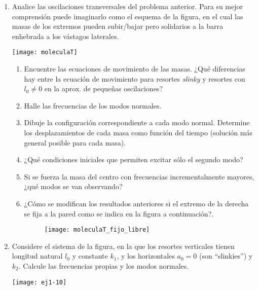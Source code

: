 \documentclass[11pt,spanish,a4paper]{article}
\begin{document}
\begin{enumerate}
\item
\begin{minipage}[t][2.2cm]{0.5\textwidth}
Analice las oscilaciones transversales del problema anterior.
Para su mejor comprensión puede imaginarlo como el esquema de la figura, en el cual las masas de los extremos pueden subir/bajar pero solidarios a la barra enhebrada a los vástagos laterales. 
\end{minipage}
\begin{minipage}[c][0cm][t]{0.45\textwidth}
  \texttt{[image: moleculaT]}
\end{minipage}
\begin{enumerate}
	\item Encuentre las ecuaciones de movimiento de las masas. ¿Qué diferencias hay entre la ecuación de movimiento para resortes \emph{slinky} y resortes con $l_0\ne 0$ en la aprox. de pequeñas oscilaciones?
	\item Halle las frecuencias de los modos normales.
	\item Dibuje la configuración correspondiente a cada modo normal.
Determine los desplazamientos de cada masa como función del tiempo (solución más general posible para cada masa).
	\item ¿Qué condiciones iniciales que permiten excitar sólo el segundo modo?
	\item Si se fuerza la masa del centro con frecuencias incrementalmente mayores, ¿qué modos se van observando?
	\item ¿Cómo se modifican los resultados anteriores si el extremo de la derecha se fija a la pared como se indica en la figura a continuación?.
	\begin{figure}[h]
		\centering
		\texttt{[image: moleculaT\_fijo\_libre]}
	\end{figure} 
\end{enumerate}



\item
\begin{minipage}[t][1.2cm]{0.6\textwidth}
Considere el sistema de la figura, en la que los resortes verticales tienen longitud natural $l_0$ y constante $k_1$, y los horizontales $a_0= 0$ (son ``slinkies'') y $k_2$.
Calcule las frecuencias propias y los modos normales. 
\end{minipage}
\begin{minipage}[c][2cm][t]{0.35\textwidth}
  \texttt{[image: ej1-10]}
\end{minipage}



\end{enumerate}
\end{document}
